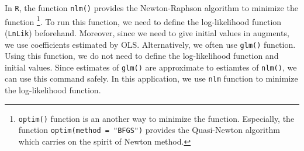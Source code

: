 \documentclass[
  12pt,
]{article}
\begin{document}
In \texttt{R}, the function \texttt{nlm()} provides the Newton-Raphson
algorithm to minimize the function \footnote{\texttt{optim()} function
  is an another way to minimize the function. Especially, the function
  \texttt{optim(method\ =\ "BFGS")} provides the Quasi-Newton algorithm
  which carries on the spirit of Newton method.}. To run this function,
we need to define the log-likelihood function (\texttt{LnLik})
beforehand. Moreover, since we need to give initial values in augments,
we use coefficients estimated by OLS. Alternatively, we often use
\texttt{glm()} function. Using this function, we do not need to define
the log-likelihood function and initial values. Since estimates of
\texttt{glm()} are approximate to estiamtes of \texttt{nlm()}, we can
use this command safely. In this application, we use \texttt{nlm}
function to minimize the log-likelihood function.
\end{document}
